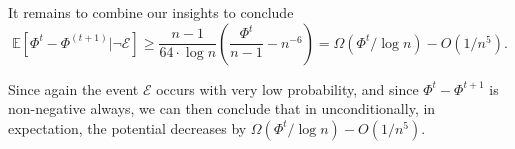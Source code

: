 It remains to combine our insights to conclude
\[
\mathbb{E}[\Phi^{t} - \Phi^{(t+1)} | \neg \mathcal{E}] \geq \frac{n-1}{64 \cdot \log n} \left( \frac{\Phi^t}{n-1} - n^{-6} \right) = \Omega(\Phi^t / \log n) - O(1/n^5).
\]

Since again the event $\mathcal{E}$ occurs with very low probability, and since $\Phi^t - \Phi^{t+1}$ is non-negative always, we can then conclude that in unconditionally, in expectation, the potential decreases by $\Omega(\Phi^t / \log n) - O(1/n^5).$


